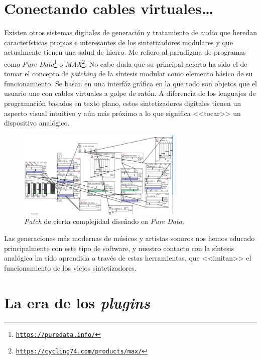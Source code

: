 \section{Conectando cables virtuales\dots}

Existen otros sistemas digitales de generación y tratamiento de audio que heredan características propias e interesantes de los sintetizadores modulares y que actualmente tienen una salud de hierro. Me refiero al paradigma de programas como \emph{Pure Data}\footnote{\href{https://puredata.info/}{\texttt{https://puredata.info/}}} o \emph{MAX}\footnote{\href{https://cycling74.com/products/max/}{\texttt{https://cycling74.com/products/max/}}}. No cabe duda que su principal acierto ha sido el de tomar el concepto de \emph{patching} de la síntesis modular como elemento básico de su funcionamiento. Se basan en una interfáz gráfica en la que todo son objetos que el usuario une con cables virtuales a golpe de ratón. A diferencia de los lenguajes de programación basados en texto plano, estos sintetizadores digitales tienen un aspecto visual intuitivo y aún más próximo a lo que significa <<tocar>> un dispositivo analógico. 

\begin{figure}
	\centering
	\includegraphics[width=0.7\textwidth]{./puredata_modular}
	\caption[\textit{Patch} en \textit{Pure Data}]{\textit{Patch} de cierta complejidad diseñado en \textit{Pure Data. }}
	\label{fig:puredata_modular}
\end{figure}

Las generaciones más modernas de músicos y artistas sonoros nos hemos educado principalmente con este tipo de software, y nuestro contacto con la síntesis analógica ha sido aprendida a través de estas herramientas, que <<imitan>> el funcionamiento de los viejos sintetizadores.

\section{La era de los \textit{plugins}}
\label{sec:plugins}

